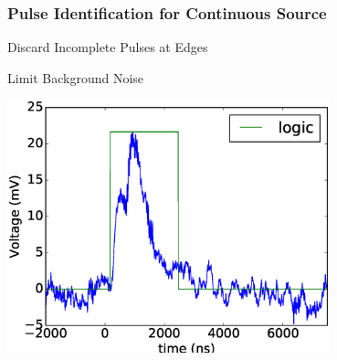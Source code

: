 \begin{frame}\frametitle{Pulse Identification for Continuous Source}
  \begin{center}
  \begin{itemize}
  \begin{center}
  \item Discard Incomplete Pulses at Edges
  \item Limit Background Noise
  \end{center}
  \end{itemize}
  \includegraphics[width=0.7\textwidth]{images/comparator/comparator_at_500ns.eps}
  \end{center}
\end{frame}

